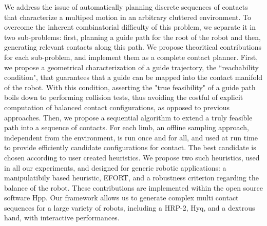 We address the issue of automatically planning discrete sequences of contacts
that characterize a multiped motion in an arbitrary cluttered environment.
To overcome the inherent combinatorial difficulty of this problem, we separate it
in two sub-problems: first, planning a guide path for the root of the robot and
then, generating relevant contacts along this path.
We propose theoritical contributions for each sub-problem, and implement them
as a complete contact planner. 
First, we propose a geometrical characterization of a guide trajectory, the ``reachability condition", that guarantees that a
guide can be mapped into the contact manifold of the robot. With this condition, asserting the "true feasibility" 
of a guide path boils down to performing collision tests, thus avoiding the costful of explicit computation of balanced contact configurations, as opposed to previous approaches.
Then, we propose a sequential algorithm to extend a truly feasible path into a sequence of contacts. For each limb, an offline sampling approach,
independent from the environment, is run once and for all, and used at run time to provide efficiently candidate configurations for contact.
The best candidate is chosen according to user created heuristics. We propose two such heuristics, used in all our experiments, and 
designed for generic robotic applications: a manipulatibily based heuristic, EFORT, and a robustness criterion regarding the balance of the robot.
These contributions are implemented within the open source software Hpp. Our framework allows us to generate complex multi contact sequences for a large
variety of robots, including a HRP-2, Hyq, and a dextrous hand, with interactive performances.
